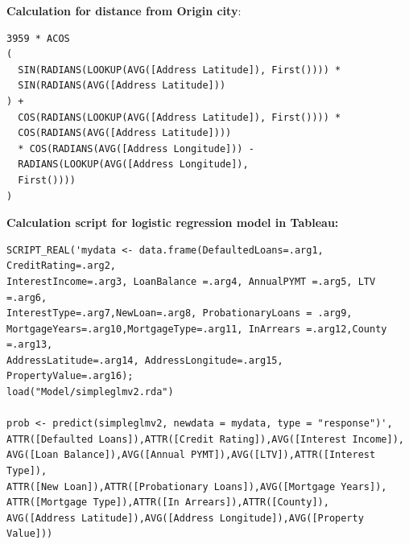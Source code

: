 \textbf{Calculation for distance from Origin city}:
\begin{verbatim}
3959 * ACOS
(
  SIN(RADIANS(LOOKUP(AVG([Address Latitude]), First()))) * 
  SIN(RADIANS(AVG([Address Latitude]))
) +
  COS(RADIANS(LOOKUP(AVG([Address Latitude]), First()))) * 
  COS(RADIANS(AVG([Address Latitude]))) 
  * COS(RADIANS(AVG([Address Longitude])) - 
  RADIANS(LOOKUP(AVG([Address Longitude]),
  First())))
)
\end{verbatim}


\textbf{Calculation script for logistic regression model in Tableau:}
\begin{verbatim}
SCRIPT_REAL('mydata <- data.frame(DefaultedLoans=.arg1, CreditRating=.arg2,
InterestIncome=.arg3, LoanBalance =.arg4, AnnualPYMT =.arg5, LTV =.arg6,
InterestType=.arg7,NewLoan=.arg8, ProbationaryLoans = .arg9, 
MortgageYears=.arg10,MortgageType=.arg11, InArrears =.arg12,County =.arg13,
AddressLatitude=.arg14, AddressLongitude=.arg15, PropertyValue=.arg16);
load("Model/simpleglmv2.rda")

prob <- predict(simpleglmv2, newdata = mydata, type = "response")',
ATTR([Defaulted Loans]),ATTR([Credit Rating]),AVG([Interest Income]),
AVG([Loan Balance]),AVG([Annual PYMT]),AVG([LTV]),ATTR([Interest Type]),
ATTR([New Loan]),ATTR([Probationary Loans]),AVG([Mortgage Years]),
ATTR([Mortgage Type]),ATTR([In Arrears]),ATTR([County]),
AVG([Address Latitude]),AVG([Address Longitude]),AVG([Property Value]))
\end{verbatim}




